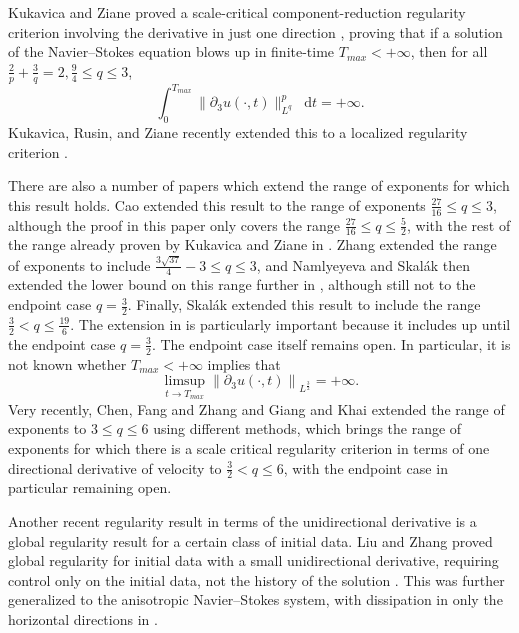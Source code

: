 \documentclass[11pt]{article}
\theoremstyle{plain}
\theoremstyle{remark}
\numberwithin{equation}{section}
\newcommand{\diff}{\mathop{}\!\mathrm{d}}
\begin{document}
Kukavica and Ziane proved a scale-critical component-reduction regularity criterion involving the derivative in just one direction \cite{KukavicaZiane}, 
proving that if a solution of the Navier--Stokes equation blows up in finite-time $T_{max}<+\infty$, then for all $\frac{2}{p}+\frac{3}{q}=2, 
\frac{9}{4}\leq q \leq 3$,
\begin{equation}
    \int_0^{T_{max}}\|\partial_3 u(\cdot,t)\|_{L^q}^p
    \diff t=+\infty.
\end{equation}
Kukavica, Rusin, and Ziane recently extended this to a localized regularity criterion \cites{KukavicaLocal}.

There are also a number of papers which extend the range of exponents for which this result holds.
Cao extended \cite{Cao} this result to the range of exponents $\frac{27}{16}\leq q\leq 3$, although the proof in this paper only covers the range $\frac{27}{16}\leq q\leq \frac{5}{2}$, with the rest of the range already proven by Kukavica and Ziane in \cite{KukavicaZiane}.
Zhang extended \cite{ZujinZhang} the range of exponents to include $\frac{3\sqrt{37}}{4}-3\leq q \leq 3$,
and Namlyeyeva and Skal\'ak then extended the lower bound on this range further in \cite{Namlyeyeva}, although still not to the endpoint case $q=\frac{3}{2}$.
Finally, Skal\'ak extended \cites{Skalak1,Skalak2} this result to include the range $\frac{3}{2}<q\leq \frac{19}{6}$.
The extension in \cite{Skalak1} is particularly important because it includes up until the endpoint case $q=\frac{3}{2}$. The endpoint case itself remains open. In particular, it is not known whether $T_{max}<+\infty$ implies that
\begin{equation}
    \limsup_{t\to T_{max}}
    \left\|\partial_3 u(\cdot,t)
    \right\|_{L^\frac{3}{2}}
    =+\infty.
\end{equation}
Very recently, Chen, Fang and Zhang \cite{CFZ} and Giang and Khai \cite{GiangKhai} extended the range of exponents to $3\leq q\leq 6$ using different methods, which brings the range of exponents for which there is a scale critical regularity criterion in terms of one directional derivative of velocity to $\frac{3}{2}<q\leq 6$, with the endpoint case in particular remaining open.

Another recent regularity result in terms of the unidirectional derivative is a global regularity result for a certain class of initial data. Liu and Zhang proved global regularity for initial data with a small unidirectional derivative, requiring control only on the initial data, not the history of the solution \cite{LiuZhang}. This was further generalized to the anisotropic Navier--Stokes system, with dissipation in only the horizontal directions in \cite{UnidirectionalAniso}.
\end{document}
